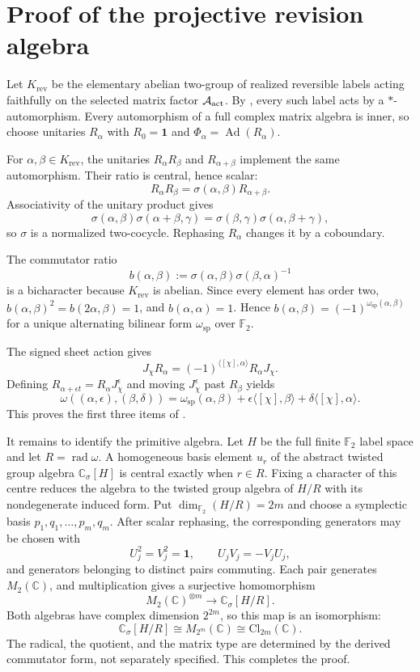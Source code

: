 \documentclass[11pt]{article}
\theoremstyle{definition}
\theoremstyle{remark}
\newcommand{\C}{\mathbb C}
\newcommand{\F}{\mathbb F}
\newcommand{\one}{\mathbf 1}
\newcommand{\Ad}{\operatorname{Ad}}
\newcommand{\rad}{\operatorname{rad}}
\newcommand{\Cl}{\mathrm{Cl}}
\newcommand{\A}{\mathcal A}
\newcommand{\spat}{\mathrm{sp}}
\newcommand{\rev}{\mathrm{rev}}
\begin{document}
\section{Proof of the projective revision algebra}
\label{app:proof-projective-revision}

Let $K_{\rev}$ be the elementary abelian two-group of realized reversible
labels acting faithfully on the selected matrix factor $\A_{\rm act}$.  By
, every such label acts by a $*$-automorphism.  Every
automorphism of a full complex matrix algebra is inner, so choose unitaries
$R_\alpha$ with $R_0=\one$ and
$\Phi_\alpha=\Ad(R_\alpha)$.

For $\alpha,\beta\in K_{\rev}$, the unitaries
$R_\alpha R_\beta$ and $R_{\alpha+\beta}$ implement the same automorphism.
Their ratio is central, hence scalar:
\[
 R_\alpha R_\beta=\sigma(\alpha,\beta)R_{\alpha+\beta}.
\]
Associativity of the unitary product gives
\[
 \sigma(\alpha,\beta)\sigma(\alpha+\beta,\gamma)
 =\sigma(\beta,\gamma)\sigma(\alpha,\beta+\gamma),
\]
so $\sigma$ is a normalized two-cocycle.  Rephasing $R_\alpha$ changes it by a
coboundary.

The commutator ratio
\[
 b(\alpha,\beta)
 :=\sigma(\alpha,\beta)\sigma(\beta,\alpha)^{-1}
\]
is a bicharacter because $K_{\rev}$ is abelian.  Since every element has order
two,
$b(\alpha,\beta)^2=b(2\alpha,\beta)=1$, and
$b(\alpha,\alpha)=1$.  Hence
$b(\alpha,\beta)=(-1)^{\omega_{\spat}(\alpha,\beta)}$ for a unique alternating
bilinear form $\omega_{\spat}$ over $\F_2$.

The signed sheet action gives
\[
 J_\chi R_\alpha
 =(-1)^{\langle[\chi],\alpha\rangle}R_\alpha J_\chi.
\]
Defining $R_{\alpha+\epsilon t}=R_\alpha J_\chi^\epsilon$ and moving
$J_\chi^\epsilon$ past $R_\beta$ yields
\[
 \omega((\alpha,\epsilon),(\beta,\delta))
 =\omega_{\spat}(\alpha,\beta)
 +\epsilon\langle[\chi],\beta\rangle
 +\delta\langle[\chi],\alpha\rangle.
\]
This proves the first three items of .

It remains to identify the primitive algebra.  Let $H$ be the full finite
$\F_2$ label space and let $R=\rad\omega$.  A homogeneous basis element $u_r$
of the abstract twisted group algebra $\C_\sigma[H]$ is central exactly when
$r\in R$.  Fixing a character of this centre reduces the algebra to the twisted
group algebra of $H/R$ with its nondegenerate induced form.  Put
$\dim_{\F_2}(H/R)=2m$ and choose a symplectic basis
$p_1,q_1,\ldots,p_m,q_m$.  After scalar rephasing, the corresponding generators
may be chosen with
\[
 U_j^2=V_j^2=\one,
 \qquad U_jV_j=-V_jU_j,
\]
and generators belonging to distinct pairs commuting.  Each pair generates
$M_2(\C)$, and multiplication gives a surjective homomorphism
\[
 M_2(\C)^{\otimes m}\longrightarrow\C_\sigma[H/R].
\]
Both algebras have complex dimension $2^{2m}$, so this map is an isomorphism:
\[
 \C_\sigma[H/R]\cong M_{2^m}(\C)\cong\Cl_{2m}(\C).
\]
The radical, the quotient, and the matrix type are determined by the derived
commutator form, not separately specified.  This completes the proof.
\end{document}
